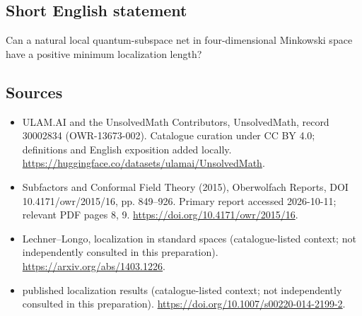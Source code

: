 \documentclass[11pt]{article}
\begin{document}
\subsection{Short English statement}
Can a natural local quantum-subspace net in four-dimensional Minkowski space have a positive minimum localization length?
\subsection{Sources}
\begin{itemize}
\item[\hypertarget{source:30002834:1}{S1}] ULAM.AI and the UnsolvedMath Contributors, UnsolvedMath, record 30002834 (OWR-13673-002). Catalogue curation under CC BY 4.0; definitions and English exposition added locally.
\url{https://huggingface.co/datasets/ulamai/UnsolvedMath}.
\item[\hypertarget{source:30002834:2}{S2}] Subfactors and Conformal Field Theory (2015), Oberwolfach Reports, DOI 10.4171/owr/2015/16, pp. 849--926. Primary report accessed 2026-10-11; relevant PDF pages 8, 9.
\url{https://doi.org/10.4171/owr/2015/16}.
\item[\hypertarget{source:30002834:3}{S3}] Lechner--Longo, localization in standard spaces (catalogue-listed context; not independently consulted in this preparation).
\url{https://arxiv.org/abs/1403.1226}.
\item[\hypertarget{source:30002834:4}{S4}] published localization results (catalogue-listed context; not independently consulted in this preparation).
\url{https://doi.org/10.1007/s00220-014-2199-2}.
\end{itemize}
\label{end:30002834}
\end{document}
